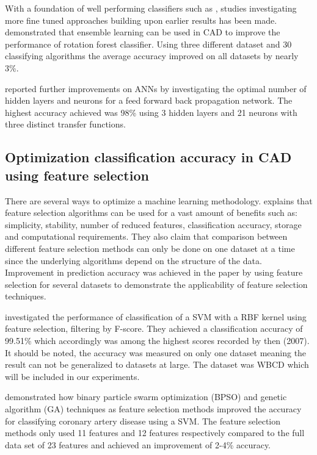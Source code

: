 With a foundation of well performing classifiers such as \parencite{ramos2012}, studies investigating more fine tuned approaches building upon earlier results has been made. \textcite{akin2011} demonstrated that ensemble learning can be used in CAD to improve the performance of rotation forest classifier. Using three different dataset and 30 classifying algorithms the average accuracy improved on all datasets by nearly 3\%.

\textcite{Abdel-Ilah2017} reported further improvements on ANNs by investigating the optimal number of hidden layers and neurons for a feed forward back propagation network. The highest accuracy achieved was 98\% using 3 hidden layers and 21 neurons with three distinct transfer functions.

\subsection{Optimization classification accuracy in CAD using feature selection}


There are several ways to optimize a machine learning methodology. \textcite{c201416} explains that feature selection algorithms can be used for a vast amount of benefits such as: simplicity, stability, number of reduced features, classification accuracy, storage and computational requirements. They also claim that comparison between different feature selection methods can only be done on one dataset at a time since the underlying algorithms depend on the structure of the data. Improvement in prediction accuracy was achieved in the paper by using feature selection for several datasets to demonstrate the applicability of feature selection techniques.

\textcite{akay2009} investigated the performance of classification of a SVM with a RBF kernel using feature selection, filtering by F-score. They achieved a classification accuracy of 99.51\% which accordingly was among the highest scores recorded by then (2007). It should be noted, the accuracy was measured on only one dataset meaning the result can not be generalized to datasets at large. The dataset was WBCD which will be included in our experiments.

\textcite{b20103177} demonstrated how  binary particle swarm optimization (BPSO) and genetic algorithm (GA) techniques as feature selection methods improved the accuracy for classifying coronary artery disease using a SVM. The feature selection methods only used 11 features and 12 features respectively compared to the full data set of 23 features and achieved an improvement of 2-4\% accuracy.

